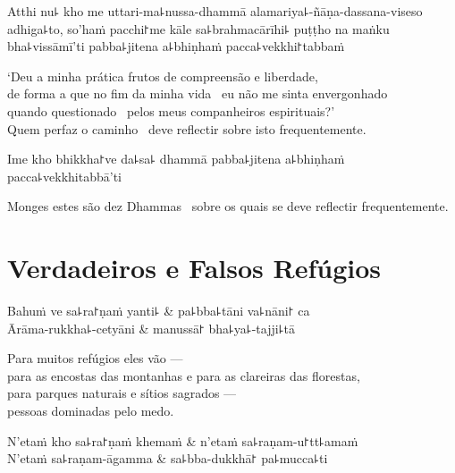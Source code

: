 Atthi nu꜕ kho me uttari-ma꜕nussa-dhammā alamariya꜕-ñāṇa-dassana-viseso adhiga꜕to, so'haṁ pacchi꜓me kāle sa꜕brahmacārīhi꜕ puṭṭho na maṅku bha꜕vissāmī'ti pabba꜕jitena a꜕bhiṇhaṁ pacca꜕vekkhi꜓tabbaṁ

\begin{english}
  `Deu a minha prática frutos de compreensão e liberdade, \pause\\ de forma a que
  no fim da minha vida \pause\ eu não me sinta envergonhado \pause\\
  quando questionado \pause\ pelos meus companheiros espirituais?' \pause\\
  Quem perfaz o caminho \pause\ deve reflectir sobre isto frequentemente.
\end{english}

Ime kho bhikkha꜓ve da꜕sa꜕ dhammā pabba꜕jitena a꜕bhiṇhaṁ pacca꜕vekkhitabbā'ti

\begin{english}
  Monges estes são dez Dhammas \pause\ sobre os quais se deve reflectir frequentemente.
\end{english}

\chapter{Verdadeiros e Falsos Refúgios}


\begin{leader}
\end{leader}

\begin{twochants}
  Bahuṁ ve sa꜕ra꜓ṇaṁ yanti꜕ & pa꜕bba꜕tāni va꜕nāni꜓ ca \\
  Ārāma-rukkha꜕-cetyāni & manussā꜓ bha꜕ya꜕-tajji꜕tā \\
\end{twochants}

\begin{english}
  Para muitos refúgios eles vão ---\\
  para as encostas das montanhas e para as clareiras das florestas,\\
  para parques naturais e sítios sagrados ---\\
  pessoas dominadas pelo medo.
\end{english}

\begin{twochants}
  N'etaṁ kho sa꜕ra꜓ṇaṁ khemaṁ & n'etaṁ sa꜕raṇam-u꜓tt꜕amaṁ \\
  N'etaṁ sa꜕raṇam-āgamma & sa꜕bba-dukkhā꜓ pa꜕mucca꜕ti \\
\end{twochants}

